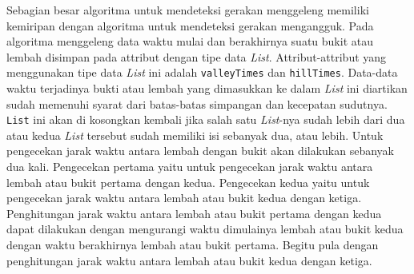 Sebagian besar algoritma untuk mendeteksi gerakan menggeleng memiliki kemiripan dengan algoritma untuk mendeteksi gerakan mengangguk. Pada algoritma menggeleng data waktu mulai dan berakhirnya suatu bukit atau lembah disimpan pada attribut dengan tipe data \textit{List}. Attribut-attribut yang menggunakan tipe data \textit{List} ini adalah \texttt{valleyTimes} dan \texttt{hillTimes}. Data-data waktu terjadinya bukti atau lembah yang dimasukkan ke dalam \textit{List} ini diartikan sudah memenuhi syarat dari batas-batas simpangan dan kecepatan sudutnya. \texttt{List} ini akan di kosongkan kembali jika salah satu \textit{List}-nya sudah lebih dari dua atau kedua \textit{List} tersebut sudah memiliki isi sebanyak dua, atau lebih. 
Untuk pengecekan jarak waktu antara lembah dengan bukit akan dilakukan sebanyak dua kali. Pengecekan pertama yaitu untuk pengecekan jarak waktu antara lembah atau bukit pertama dengan kedua. Pengecekan kedua yaitu untuk pengecekan jarak waktu antara lembah atau bukit kedua dengan ketiga. Penghitungan jarak waktu antara lembah atau bukit pertama dengan kedua dapat dilakukan dengan mengurangi waktu dimulainya lembah atau bukit kedua dengan waktu berakhirnya lembah atau bukit pertama. Begitu pula dengan penghitungan jarak waktu antara lembah atau bukit kedua dengan ketiga.